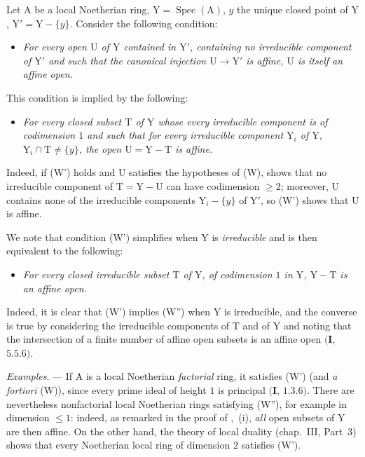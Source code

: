 \begin{env}[21.12.8]
\label{IV.21.12.8}
Let $\mathrm{A}$ be a local Noetherian ring, $\mathrm{Y}=\operatorname{Spec}(\mathrm{A})$, $y$ the unique closed point of $\mathrm{Y}$, $\mathrm{Y}'=\mathrm{Y}-\{y\}$.
Consider the following condition:
\begin{itemize}
  \item[\textup{(W)}] \emph{For every open $\mathrm{U}$ of $\mathrm{Y}$ contained in $\mathrm{Y}'$, containing no irreducible component of $\mathrm{Y}'$ and such that the canonical injection $\mathrm{U}\to\mathrm{Y}'$ is affine, $\mathrm{U}$ is itself an affine open.}
\end{itemize}

This condition is implied by the following:
\begin{itemize}
  \item[\textup{(W')}] \emph{For every closed subset $\mathrm{T}$ of $\mathrm{Y}$ whose every irreducible component is of codimension $1$ and such that for every irreducible component $\mathrm{Y}_i$ of $\mathrm{Y}$, $\mathrm{Y}_i\cap\mathrm{T}\neq\{y\}$, the open $\mathrm{U}=\mathrm{Y}-\mathrm{T}$ is affine.}
\end{itemize}

Indeed, if (W') holds and $\mathrm{U}$ satisfies the hypotheses of (W),  shows that no irreducible component of $\mathrm{T}=\mathrm{Y}-\mathrm{U}$ can have codimension $\geq 2$; moreover, $\mathrm{U}$ contains none of the irreducible components $\mathrm{Y}_i-\{y\}$ of $\mathrm{Y}'$, so (W') shows that $\mathrm{U}$ is affine.

We note that condition (W') simplifies when $\mathrm{Y}$ is \emph{irreducible} and is then equivalent to the following:
\begin{itemize}
  \item[\textup{(W'')}] \emph{For every closed irreducible subset $\mathrm{T}$ of $\mathrm{Y}$, of codimension $1$ in $\mathrm{Y}$, $\mathrm{Y}-\mathrm{T}$ is an affine open.}
\end{itemize}

Indeed, it is clear that (W') implies (W'') when $\mathrm{Y}$ is irreducible, and the converse is true by considering the irreducible components of $\mathrm{T}$ and of $\mathrm{Y}$ and noting that the intersection of a finite number of affine open subsets is an affine open $(\mathbf{I}$, $5.5.6)$.
\end{env}

\begin{env}[21.12.9]
\label{IV.21.12.9}
\emph{Examples}. ---
If $\mathrm{A}$ is a local Noetherian \emph{factorial} ring, it satisfies (W') (and \emph{a fortiori} (W)), since every prime ideal of height $1$ is principal $(\mathbf{I}$, $1.3.6)$.
There are nevertheless nonfactorial local Noetherian rings satisfying (W''), for example in dimension $\leq 1$: indeed, as remarked in the proof of ,~(i), \emph{all} open subsets of $\mathrm{Y}$ are then affine.
On the other hand, the theory of local duality (chap.~III, Part~3) shows that every Noetherian local ring of dimension $2$ satisfies (W').
\end{env}


